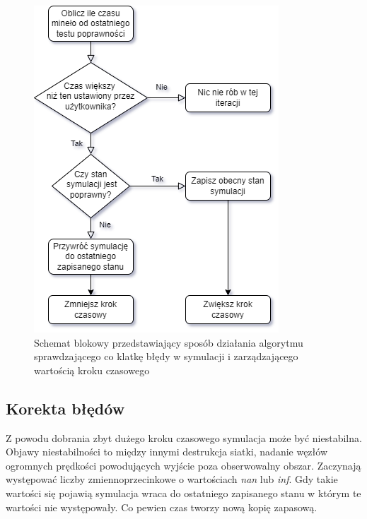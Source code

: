 \documentclass[12pt, letterpaper]{report}
\begin{document}
    \begin{figure}
        \includegraphics[width=0.95\linewidth]{error_correction.drawio.png}
        \caption{
            Schemat blokowy przedstawiający sposób działania
            algorytmu sprawdzającego co klatkę
            błędy w symulacji i zarządzającego wartością kroku czasowego
        }
    \end{figure}

    \subsection{Korekta błędów}
    Z powodu dobrania zbyt dużego kroku czasowego symulacja może być niestabilna.
    Objawy niestabilności to między innymi destrukcja siatki, nadanie węzłów 
    ogromnych prędkości powodujących wyjście poza obserwowalny obszar.
    Zaczynają występować liczby zmiennoprzecinkowe o wartościach \emph{nan} lub \emph{inf}.
    Gdy takie wartości się pojawią symulacja wraca do ostatniego zapisanego stanu w którym 
    te wartości nie występowały. Co pewien czas tworzy nową kopię zapasową.
\end{document}
